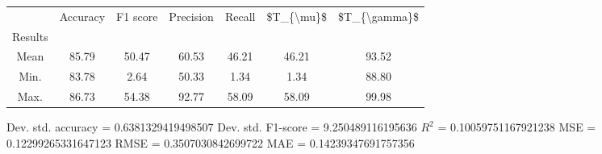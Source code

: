 \begin{tabular}{|c|c|c|c|c|c|c|}
\toprule
{} &  Accuracy &  F1 score &  Precision &  Recall &  \$T\_\{\textbackslash mu\}\$ &  \$T\_\{\textbackslash gamma\}\$ \\
Results &           &           &            &         &            &               \\
\hline
Mean    &     85.79 &     50.47 &      60.53 &   46.21 &      46.21 &         93.52 \\
Min.    &     83.78 &      2.64 &      50.33 &    1.34 &       1.34 &         88.80 \\
Max.    &     86.73 &     54.38 &      92.77 &   58.09 &      58.09 &         99.98 \\
\bottomrule
\end{tabular}

 Dev. std. accuracy = 0.6381329419498507
 Dev. std. F1-score = 9.250489116195636
 $R^2$ = 0.10059751167921238
 MSE = 0.12299265331647123
 RMSE = 0.3507030842699722
 MAE = 0.14239347691757356